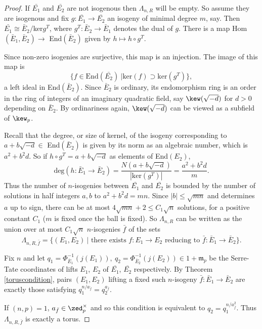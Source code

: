 \documentclass[12pt,letterpaper]{article}
\begin{document}
	\begin{proof}
		If $\bar{E_1}$ and $\bar{E_2}$ are not isogenous then $\Lambda_{n,R}$ will be empty. So assume they are isogenous and fix $g\colon\bar{E_1}\to \bar{E_2}$ an isogeny of minimal degree $m$, say. Then $\bar{E_1}\cong \bar{E}_2/$ker$g^T$, where $g^T\colon\bar{E}_2\to\bar{E}_1$ denotes the dual of $g$. There is a map Hom$(\bar{E}_1,\bar{E}_2)\to$ End$(\bar{E}_2)$ given by $h\mapsto h\circ g^T$.
		
		Since non-zero isogenies are surjective, this map is an injection. The image of this map is \[\{f\in \text{End}(\bar{E_2}) \ | \text{ker}(f)\supset \text{ker}(g^T)\},\] a left ideal in End$(\bar{E}_2)$. Since $\bar{E}_2$ is ordinary, its endomorphism ring is an order in the ring of integers of an imaginary quadratic field, say $\kew(\sqrt{-d})$ for $d>0$ depending on $\bar{E}_2$. By ordinariness again, $\kew(\sqrt{-d})$ can be viewed as a subfield of $\kew_p$.
		
		
		Recall that the degree, or size of kernel, of the isogeny corresponding to $a+b\sqrt{-d}\in$ End$(\bar{E}_2)$ is given by its norm as an algebraic number, which is $a^2+b^2d$. So if $h\circ g^T = a+b\sqrt{-d}$ as elements of End$(E_2)$,
		\[\text{deg}(h\colon\bar{E}_1\to\bar{E}_2) = \frac{N(a+b\sqrt{-d})}{|\text{ker}(g^T)|} = \frac{a^2+b^2d}{m}.\]
		Thus the number of $n$-isogenies between $\bar{E_1}$ and $\bar{E_2}$ is bounded by the number of solutions in half integers $a,b$ to $a^2+b^2d=mn$. Since $|b|\leq \sqrt{mn}$ and determines $a$ up to sign, there can be at most $4\sqrt{mn}+2\leq C_1\sqrt{n}$ solutions, for a positive constant $C_1$ ($m$ is fixed once the ball is fixed). So $\Lambda_{n,R}$ can be written as the union over at most $C_1\sqrt{n}$ $n$-isogenies $\bar{f}$ of the sets \[\Lambda_{n,R,\bar{f}} = \{(E_1,E_2) \ | \text{ there exists } f\colon E_1\to E_2 \text{ reducing to } \bar{f}\colon\bar{E}_1\to\bar{E}_2\}.\]
		
		
		Fix $n$ and let $q_1=\Phi_{\bar{E}_1}^{-1}(j(E_1)),\ q_2=\Phi_{\bar{E}_2}^{-1}(j(E_2))\in 1+\mathfrak{m}_p$ be the Serre-Tate coordinates of lifts $E_1$, $E_2$ of $\bar{E_1}$, $\bar{E_2}$ respectively. By Theorem \ref{toruscondition}, pairs $(E_1,E_2)$ lifting a fixed such $n$-isogeny $\bar{f}\colon\bar{E}_1\to\bar{E}_2$ are exactly those satisfying $q_1^{n/a_{\bar{f}}} = q_2^{a_{\bar{f}}}$. 
		
		If $(n,p)=1$, $a_{\bar{f}}\in \zed_p^\times$ and so this condition is equivalent to $q_2 = q_1^{n/a_{\bar{f}}^2}$. Thus $\Lambda_{n,R,\bar{f}}$ is exactly a torus.
		

\end{proof}
\end{document}
